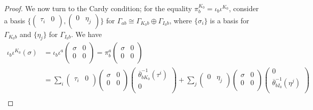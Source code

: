 \begin{proof}
We now turn to the Cardy condition; for the equality $\pi^{K_0}_b=\iota_b\iota^{K_0}$, consider a basis $\{\left (\begin{smallmatrix} \tau_i & 0 \\ \end{smallmatrix} \right ), \left (\begin{smallmatrix} 0 & \eta_j  \\ \end{smallmatrix} \right )\}$ for $\Gamma_{ab}\cong \Gamma_{K_0b}\oplus \Gamma_{I_0b}$, where $\{\sigma_i\}$ is a basis for $\Gamma_{K_0b}$ and $\{\eta_j\}$ for $\Gamma_{I_0b}$. We have
$$
\begin{aligned}
\iota_b\iota^{K_0}(\sigma ) &= \iota_b\iota^a \left (\begin{smallmatrix} \sigma & 0 \\ 0 & 0 \\ \end{smallmatrix} \right ) = \pi^a_b \left (\begin{smallmatrix} \sigma & 0 \\ 0 & 0 \\ \end{smallmatrix} \right ) \\
														&= \sum_i\left (\begin{smallmatrix} \tau_i & 0 \\ \end{smallmatrix} \right )\left (\begin{smallmatrix} \sigma & 0 \\ 0 & 0 \\ \end{smallmatrix} \right ) \left (\begin{smallmatrix} \overline{\theta}_{bK_0}^{-1}(\tau^i) \\ 0 \\ \end{smallmatrix} \right ) + \sum_j \left (\begin{smallmatrix} 0 & \eta_j \\ \end{smallmatrix} \right )\left (\begin{smallmatrix} \sigma & 0 \\ 0 & 0 \\ \end{smallmatrix} \right ) \left (\begin{smallmatrix} 0 \\ \overline{\theta}_{bI_0}^{-1}(\eta^j) \\ \end{smallmatrix} \right ) \\

\end{aligned}$$
\end{proof}
